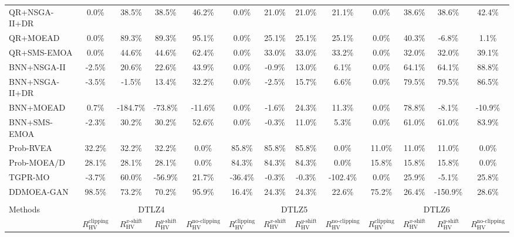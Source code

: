 \begin{table}[htbp]
{\begin{tabular}{l c c c c c c c c c c c c}
QR+NSGA-II+DR & 0.0\% & 38.5\% & 38.5\% & 46.2\% & 0.0\% & 21.0\% & 21.0\% & 21.1\% & 0.0\% & 38.6\% & 38.6\% & 42.4\% \\
QR+MOEAD & 0.0\% & 89.3\% & 89.3\% & 95.1\% & 0.0\% & 25.1\% & 25.1\% & 25.1\% & 0.0\% & 40.3\% & -6.8\% & 1.1\% \\
QR+SMS-EMOA & 0.0\% & 44.6\% & 44.6\% & 62.4\% & 0.0\% & 33.0\% & 33.0\% & 33.2\% & 0.0\% & 32.0\% & 32.0\% & 39.1\% \\
BNN+NSGA-II & -2.5\% & 20.6\% & 22.6\% & 43.9\% & 0.0\% & -0.9\% & 13.0\% & 6.1\% & 0.0\% & 64.1\% & 64.1\% & 88.8\% \\
BNN+NSGA-II+DR & -3.5\% & -1.5\% & 13.4\% & 32.2\% & 0.0\% & -2.5\% & 15.7\% & 6.6\% & 0.0\% & 79.5\% & 79.5\% & 86.5\% \\
BNN+MOEAD & 0.7\% & -184.7\% & -73.8\% & -11.6\% & 0.0\% & -1.6\% & 24.3\% & 11.3\% & 0.0\% & 78.8\% & -8.1\% & -10.9\% \\
BNN+SMS-EMOA & -2.3\% & 30.2\% & 30.2\% & 52.6\% & 0.0\% & -0.3\% & 11.0\% & 5.3\% & 0.0\% & 61.0\% & 61.0\% & 83.9\% \\
Prob-RVEA & 32.2\% & 32.2\% & 32.2\% & 0.0\% & 85.8\% & 85.8\% & 85.8\% & 0.0\% & 11.0\% & 11.0\% & 11.0\% & 0.0\% \\
Prob-MOEA/D & 28.1\% & 28.1\% & 28.1\% & 0.0\% & 84.3\% & 84.3\% & 84.3\% & 0.0\% & 15.8\% & 15.8\% & 15.8\% & 0.0\% \\
TGPR-MO & -3.7\% & 60.0\% & -56.9\% & 21.7\% & -36.4\% & -0.3\% & -0.3\% & -102.4\% & 0.0\% & 25.9\% & -5.1\% & 25.8\% \\
DDMOEA-GAN & 98.5\% & 73.2\% & 70.2\% & 95.9\% & 16.4\% & 24.3\% & 24.3\% & 22.6\% & 75.2\% & 26.4\% & -150.9\% & 28.6\% \\
\hline
\multicolumn{13}{c}{} \\
\hline
Methods & \multicolumn{4}{c}{DTLZ4} & \multicolumn{4}{c}{DTLZ5} & \multicolumn{4}{c}{DTLZ6} \\
\cmidrule(lr){2-5} \cmidrule(lr){6-9} \cmidrule(lr){10-13}
 & $R_{\mathrm{HV}}^{\mathrm{clipping}}$ & $R_{\mathrm{HV}}^{x\text{-}\mathrm{shift}}$ & $R_{\mathrm{HV}}^{y\text{-}\mathrm{shift}}$ & $R_{\mathrm{HV}}^{\mathrm{no\text{-}clipping}}$ & $R_{\mathrm{HV}}^{\mathrm{clipping}}$ & $R_{\mathrm{HV}}^{x\text{-}\mathrm{shift}}$ & $R_{\mathrm{HV}}^{y\text{-}\mathrm{shift}}$ & $R_{\mathrm{HV}}^{\mathrm{no\text{-}clipping}}$ & $R_{\mathrm{HV}}^{\mathrm{clipping}}$ & $R_{\mathrm{HV}}^{x\text{-}\mathrm{shift}}$ & $R_{\mathrm{HV}}^{y\text{-}\mathrm{shift}}$ & $R_{\mathrm{HV}}^{\mathrm{no\text{-}clipping}}$ \\

\end{tabular}}
\end{table}
